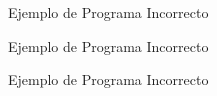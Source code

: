 \label{subsec: lexerIncorr}
\begin{figure}[H]
    \caption{Ejemplo de Programa Incorrecto}
    \label{fig: lexincorr1}
\end{figure}

\begin{figure}[H]
    \caption{Ejemplo de Programa Incorrecto}
    \label{fig: lexincorr2}
\end{figure}

\begin{figure}[H]
    \caption{Ejemplo de Programa Incorrecto}
    \label{fig: lexincorr3}
\end{figure}

